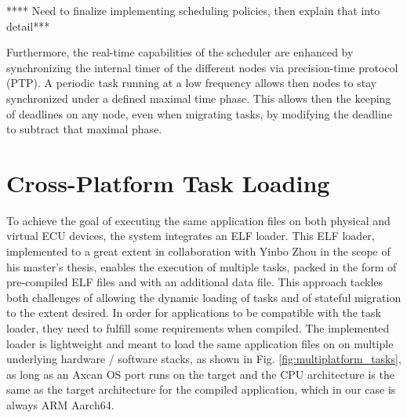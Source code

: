 **** Need to finalize implementing scheduling policies, then explain that into detail***

Furthermore, the real-time capabilities of the scheduler are enhanced by synchronizing the internal timer of the different nodes via precision-time protocol (PTP). A periodic task running at a low frequency allows then nodes to stay synchronized under a defined maximal time phase. This allows then the keeping of deadlines on any node, even when migrating tasks, by modifying the deadline to subtract that maximal phase.

\section{Cross-Platform Task Loading}

To achieve the goal of executing the same application files on both physical and virtual ECU devices, the system integrates an ELF loader. This ELF loader, implemented to a great extent in collaboration with Yinbo Zhou in the scope of his master's thesis, enables the execution of multiple tasks, packed in the form of pre-compiled ELF files and with an additional data file. This approach tackles both challenges of allowing the dynamic loading of tasks and of stateful migration to the extent desired. In order for applications to be compatible with the task loader, they need to fulfill some requirements when compiled. The implemented loader is lightweight and meant to load the same application files on on multiple underlying hardware / software stacks, as shown in Fig. \ref{fig:multiplatform_tasks}, as long as an Axcan OS port runs on the target and the CPU architecture is the same as the target architecture for the compiled application, which in our case is always ARM Aarch64.


%	
%	

